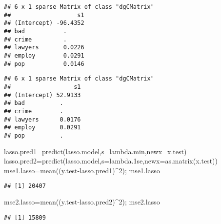 \documentclass[
  11pt,
]{article}
\newenvironment{Shaded}{\begin{snugshade}}{\end{snugshade}}
\newcommand{\AttributeTok}[1]{\textcolor[rgb]{0.77,0.63,0.00}{#1}}
\newcommand{\DecValTok}[1]{\textcolor[rgb]{0.00,0.00,0.81}{#1}}
\newcommand{\FloatTok}[1]{\textcolor[rgb]{0.00,0.00,0.81}{#1}}
\newcommand{\FunctionTok}[1]{\textcolor[rgb]{0.00,0.00,0.00}{#1}}
\newcommand{\NormalTok}[1]{#1}
\newcommand{\OtherTok}[1]{\textcolor[rgb]{0.56,0.35,0.01}{#1}}
\newcommand{\SpecialCharTok}[1]{\textcolor[rgb]{0.00,0.00,0.00}{#1}}
\begin{document}
\begin{verbatim}
## 6 x 1 sparse Matrix of class "dgCMatrix"
##                   s1
## (Intercept) -96.4352
## bad           .     
## crime         .     
## lawyers       0.0226
## employ        0.0291
## pop           0.0146
\end{verbatim}

\begin{Shaded}
\end{Shaded}

\begin{verbatim}
## 6 x 1 sparse Matrix of class "dgCMatrix"
##                  s1
## (Intercept) 52.9133
## bad          .     
## crime        .     
## lawyers      0.0176
## employ       0.0291
## pop          .
\end{verbatim}

\begin{Shaded}
\begin{Highlighting}[]
\NormalTok{lasso.pred1}\OtherTok{=}\FunctionTok{predict}\NormalTok{(lasso.model,}\AttributeTok{s=}\NormalTok{lambda.min,}\AttributeTok{newx=}\NormalTok{x.test) }
\NormalTok{lasso.pred2}\OtherTok{=}\FunctionTok{predict}\NormalTok{(lasso.model,}\AttributeTok{s=}\NormalTok{lambda}\FloatTok{.1}\NormalTok{se,}\AttributeTok{newx=}\FunctionTok{as.matrix}\NormalTok{(x.test))}
\NormalTok{mse1.lasso}\OtherTok{=}\FunctionTok{mean}\NormalTok{((y.test}\SpecialCharTok{{-}}\NormalTok{lasso.pred1)}\SpecialCharTok{\^{}}\DecValTok{2}\NormalTok{); mse1.lasso}
\end{Highlighting}
\end{Shaded}

\begin{verbatim}
## [1] 20407
\end{verbatim}

\begin{Shaded}
\begin{Highlighting}[]
\NormalTok{mse2.lasso}\OtherTok{=}\FunctionTok{mean}\NormalTok{((y.test}\SpecialCharTok{{-}}\NormalTok{lasso.pred2)}\SpecialCharTok{\^{}}\DecValTok{2}\NormalTok{); mse2.lasso}
\end{Highlighting}
\end{Shaded}

\begin{verbatim}
## [1] 15809
\end{verbatim}
\end{document}
